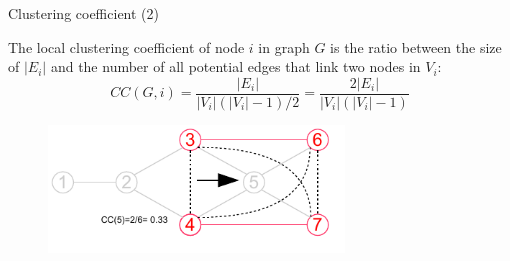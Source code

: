 \begin{frame}{Clustering coefficient (2)}

\begin{definition}
The \alert{local clustering coefficient} of node $i$ in graph $G$ is the
  ratio between the size of $|E_i|$ and the number of all potential edges
  that link two nodes in $V_i$:
  \[
     CC(G,i) = \frac{|E_i|}{|V_i|(|V_i|-1)/2} = \frac{2|E_i|}{|V_i|(|V_i|-1)}
  \]
\end{definition}

\begin{figure}
\includegraphics[width=0.7\textwidth]{induced3}
\end{figure}

\end{frame}

